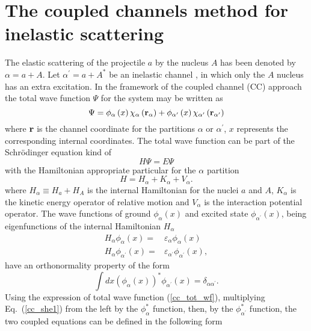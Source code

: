 \documentclass[
12pt, %
oneside, %
english, %
doublespacing, %
doublespacing, %
toctotoc, %
parskip, %
headsepline, %
]{MastersDoctoralThesis} %
\begin{document}
\section{The coupled channels method for inelastic scattering}
The elastic scattering of the projectile $a$ by the nucleus $A$ has been denoted by $\alpha=a+A$. 
 Let $\alpha^{\prime}=a+A^{*}$ be an inelastic channel , in which only the $A$ nucleus has an extra excitation. In the framework of the coupled channel (CC) approach  the total wave function $\Psi$ for the system may be written as
\begin{equation}
\Psi =  \phi_\alpha \left( { x} \right) \chi_\alpha \left( {\bf r}_\alpha \right)+
\phi_{\alpha^{\prime}}  \left( { x} \right) \chi_{\alpha^{\prime}} \left( {\bf r}_{\alpha^{\prime}} \right)
\label{cc_tot_wf}
\end{equation}
 where ${\bf r}$ is the channel coordinate for the partitions $\alpha$ or $\alpha^{\prime}$, $x$ represents the corresponding internal coordinates.
 The total wave function can be part of the Schr\"{o}dinger equation kind of
 \begin{equation}
 H\Psi=E\Psi
 \label{cc_she1}
 \end{equation}
with the Hamiltonian appropriate particular for the $\alpha$ partition
\begin{equation}
H=H_\alpha + K_\alpha + V_\alpha.
\end{equation}
where $H_\alpha \equiv H_a + H_A$ is the internal Hamiltonian for the nuclei $a$ and $A$, $K_\alpha$ is the kinetic energy operator of relative motion and $V_\alpha$ is the interaction potential operator. The wave functions of ground $ \phi_\alpha \left( { x} \right) $ and excited state $ \phi_{\alpha^{\prime}}  \left( { x} \right)$, being eigenfunctions of the internal Hamiltonian $H_\alpha$
 \begin{align}
H_\alpha  \phi_\alpha \left( { x} \right) =& \varepsilon_\alpha \phi_\alpha \left( { x} \right) \nonumber \\
H_\alpha  \phi_{\alpha^{\prime}} \left( { x} \right) =& \varepsilon_{\alpha^{\prime}} \phi_{\alpha^{\prime}} \left( { x} \right),
 \end{align}
have an orthonormality property  of the form 
\begin{equation}
\int {d x} \left( \phi_\alpha \left( { x} \right)  \right)^{*} \phi_{\alpha^{\prime}} \left( { x}\right) =
\delta_{\alpha \alpha^{\prime}}.
\label{cc_orthonorm}
\end{equation}
 Using the expression of total wave function (\ref{cc_tot_wf}), multiplying Eq.~(\ref{cc_she1}) from the left by the $\phi^{*}_\alpha$ function, then, by the $\phi^{*}_{\alpha^{\prime}}$ function, the two coupled equations can be defined in the following form 
\end{document}
